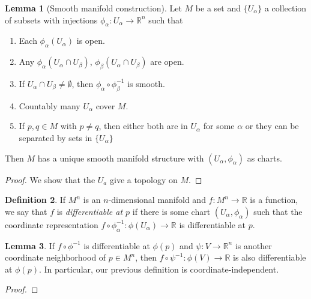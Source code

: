 \documentclass[10pt,letterpaper,cm]{nupset}
\theoremstyle{definition}
\newtheorem{definition}{Definition}[subsection]
\theoremstyle{theorem}
\newtheorem{lemma}[definition]{Lemma}
\theoremstyle{remark}
\newcommand{\R}{\mathbb R}
\newcommand{\1}{\mathbf{1}}
\newcommand{\0}{\vec 0}
\begin{document}
\begin{lemma}[Smooth manifold construction]\label{smc}
Let $M$ be a set and $\{U_\alpha\}$ a collection of subsets with injections $\phi_\alpha : U_\alpha \to \R^n$ such that
\begin{enumerate}
\item Each $\phi_\alpha(U_\alpha)$ is open.
\item Any $\phi_\alpha(U_\alpha \cap U_\beta)$, $\phi_\beta(U_\alpha \cap U_\beta)$ are open.
\item If $U_\alpha \cap U_\beta \ne \emptyset$, then $\phi_\alpha \circ \phi_\beta^{-1}$ is smooth. 
\item Countably many $U_\alpha$ cover $M$.
\item If $p, q\in M$ with $p\ne q$, then either both are in $U_\alpha$ for some $\alpha$ or they can be separated by sets in $\{U_\alpha\}$
\end{enumerate}

Then $M$ has a unique smooth manifold structure with $(U_\alpha, \phi_\alpha)$ as charts. 
\end{lemma}

\begin{proof}
We show that the $U_a$ give a topology on $M$.
\end{proof}

\begin{definition}
If $M^n$ is an $n$-dimensional manifold and $f: M^n \to \R$ is a function, we say that $f$ is \textit{differentiable at $p$} if there is some chart $(U_\alpha, \phi_\alpha)$ such that the coordinate representation $f\circ \phi_\alpha^{-1}: \phi(U_\alpha) \to \R$ is differentiable at $p$.
\end{definition}

\begin{lemma}
If $f \circ \phi^{-1}$ is differentiable at $\phi(p)$ and $\psi: V \to \R^n$ is another coordinate neighborhood of $p\in M^n$, then $f \circ \psi^{-1}: \phi(V) \to \R$ is also differentiable at $\phi(p)$. In particular, our previous definition is coordinate-independent. 
\end{lemma}
\begin{proof}

\end{proof}
\end{document}
